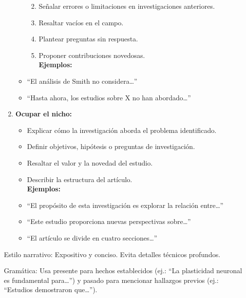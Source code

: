 \documentclass[
  10pt]{article}
\providecommand{\tightlist}{%
  \setlength{\itemsep}{0pt}\setlength{\parskip}{0pt}}\usepackage{longtable,booktabs,array}
\begin{document}
\begin{tcolorbox}
\begin{enumerate}
\begin{itemize}
    \begin{enumerate}
    \def\labelenumii{\alph{enumii})}
    \tightlist
    \item
      Señalar errores o limitaciones en investigaciones anteriores.\\
    \item
      Resaltar vacíos en el campo.\\
    \item
      Plantear preguntas sin respuesta.\\
    \item
      Proponer contribuciones novedosas.\\
      \textbf{Ejemplos:}\\
    \end{enumerate}
  \item
    ``El análisis de Smith no considera\ldots{}''\\
  \item
    ``Hasta ahora, los estudios sobre X no han abordado\ldots{}''
  \end{itemize}
\item
  \textbf{Ocupar el nicho:}

  \begin{itemize}
  \tightlist
  \item
    Explicar cómo la investigación aborda el problema identificado.\\
  \item
    Definir objetivos, hipótesis o preguntas de investigación.\\
  \item
    Resaltar el valor y la novedad del estudio.\\
  \item
    Describir la estructura del artículo.\\
    \textbf{Ejemplos:}\\
  \item
    ``El propósito de esta investigación es explorar la relación
    entre\ldots{}''\\
  \item
    ``Este estudio proporciona nuevas perspectivas sobre\ldots{}''\\
  \item
    ``El artículo se divide en cuatro secciones\ldots{}''
  \end{itemize}
\end{enumerate}

Estilo narrativo: Expositivo y conciso. Evita detalles técnicos
profundos.

Gramática: Usa presente para hechos establecidos (ej.: ``La plasticidad
neuronal es fundamental para\ldots{}'') y pasado para mencionar
hallazgos previos (ej.: ``Estudios demostraron que\ldots{}'').

\end{tcolorbox}
\end{document}
